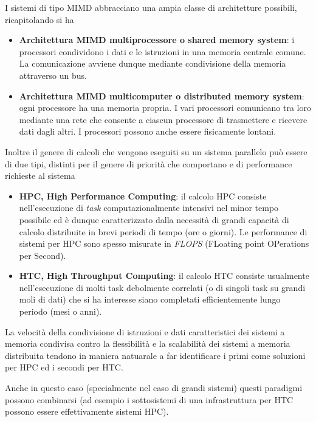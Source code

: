 \documentclass[italian,]{article}
\providecommand{\tightlist}{%
  \setlength{\itemsep}{0pt}\setlength{\parskip}{0pt}}
\begin{document}
I sistemi di tipo MIMD abbracciano una ampia classe di architetture
possibili, ricapitolando si ha

\begin{itemize}
\tightlist
\item
  \textbf{Architettura MIMD multiprocessore o shared memory system}: i
  processori condividono i dati e le istruzioni in una memoria centrale
  comune. La comunicazione avviene dunque mediante condivisione della
  memoria attraverso un bus.
\item
  \textbf{Architettura MIMD multicomputer o distributed memory system}:
  ogni processore ha una memoria propria. I vari processori comunicano
  tra loro mediante una rete che consente a ciascun processore di
  trasmettere e ricevere dati dagli altri. I processori possono anche
  essere fisicamente lontani.
\end{itemize}

Inoltre il genere di calcoli che vengono eseguiti su un sistema
parallelo può essere di due tipi, distinti per il genere di priorità che
comportano e di performance richieste al sistema

\begin{itemize}
\tightlist
\item
  \textbf{HPC, High Performance Computing}: il calcolo HPC consiste
  nell'esecuzione di \emph{task} computazionalmente intensivi nel minor
  tempo possibile ed è dunque caratterizzato dalla necessità di grandi
  capacità di calcolo distribuite in brevi periodi di tempo (ore o
  giorni). Le performance di sistemi per HPC sono spesso misurate in
  \emph{FLOPS} (FLoating point OPerations per Second).
\item
  \textbf{HTC, High Throughput Computing}: il calcolo HTC consiste
  usualmente nell'esecuzione di molti task debolmente correlati (o di
  singoli task su grandi moli di dati) che si ha interesse siano
  completati efficientemente lungo periodo (mesi o anni).
\end{itemize}

La velocità della condivisione di istruzioni e dati caratteristici dei
sistemi a memoria condivisa contro la flessibilità e la scalabilità dei
sistemi a memoria distribuita tendono in maniera natuarale a far
identificare i primi come soluzioni per HPC ed i secondi per HTC.

Anche in questo caso (specialmente nel caso di grandi sistemi) questi
paradigmi possono combinarsi (ad esempio i sottosistemi di una
infrastruttura per HTC possono essere effettivamente sistemi HPC).
\end{document}
